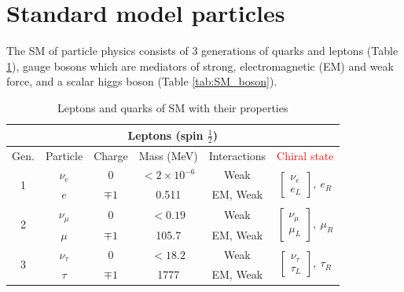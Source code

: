 \section{Standard model particles}
The SM of particle physics consists of 3 generations of quarks and leptons (Table \ref{tab:SM}), gauge bosons which are mediators of strong, electromagnetic (EM) and weak force, and a scalar higgs boson (Table \ref{tab:SM_boson}).

\begin{table}[h!]
\centering
\caption{Leptons and quarks of SM with their properties}
\label{tab:SM}
\begin{tabular}{c|c|c|c|c|c}
\hline
\multicolumn{6}{c}{Leptons (spin $\frac{1}{2}$)}\\ \hline
Gen.         & Particle & Charge & Mass (MeV) & Interactions\footnotemark & \textcolor{red}{Chiral state}\\ \hline
\multirow{2}{*}{1} & $\nu_e$  &  0     & $<2\times10^{-6}$     & Weak & \multirow{2}{*}{$\begin{bmatrix} \nu_e \\ e_{L}\end{bmatrix},\ e_{R}$}\\
& $e$      &	 $\mp1$ & 0.511  & EM, Weak      &	\\ \hline
\multirow{2}{*}{2} & $\nu_\mu$  &  0     & $<0.19$  & Weak & \multirow{2}{*}{$\begin{bmatrix} \nu_\mu \\ \mu_{L}\end{bmatrix},\ \mu_{R}$}\\
& $\mu$      &	 $\mp1$ & 105.7  & EM, Weak      &	\\ \hline
\multirow{2}{*}{3} & $\nu_\tau$  &  0     & $<18.2$  & Weak & \multirow{2}{*}{$\begin{bmatrix} \nu_\tau \\ \tau_{L}\end{bmatrix},\ \tau_{R}$}\\
& $\tau$      &	 $\mp1$ & 1777  & EM, Weak      &	\\ \hline


\end{tabular}
\end{table}
